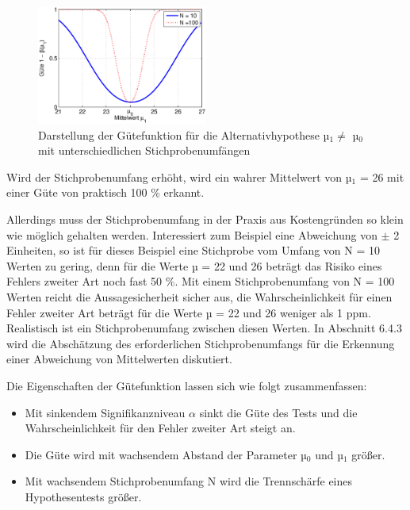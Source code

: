 \noindent 
\begin{figure}[H]
  \centerline{\includegraphics[width=0.5\textwidth]{Kapitel6/Bilder/image12}}
  \caption{Darstellung der G\"{u}tefunktion f\"{u}r die Alternativhypothese µ$_{1} \neq$ µ$_{0}$ mit unterschiedlichen Stichprobenumf\"{a}ngen}
  \label{fig:HypothesentestFehler4}
\end{figure}

\noindent Wird der Stichprobenumfang erh\"{o}ht, wird ein wahrer Mittelwert von µ$_{1}$ = 26 mit einer G\"{u}te von praktisch 100 \% erkannt. \newline

\noindent Allerdings muss der Stichprobenumfang in der Praxis aus Kostengr\"{u}nden so klein wie m\"{o}glich gehalten werden. Interessiert zum Beispiel eine Abweichung von $\pm$ 2 Einheiten, so ist f\"{u}r dieses Beispiel eine Stichprobe vom Umfang von N = 10 Werten zu gering, denn f\"{u}r die Werte µ = 22 und 26 betr\"{a}gt das Risiko eines Fehlers zweiter Art noch fast 50 \%. Mit einem Stichprobenumfang von N = 100 Werten reicht die Aussagesicherheit sicher aus, die Wahrscheinlichkeit f\"{u}r einen Fehler zweiter Art betr\"{a}gt f\"{u}r die Werte µ = 22 und 26 weniger als 1 ppm. Realistisch ist ein Stichprobenumfang zwischen diesen Werten. In Abschnitt 6.4.3 wird die Absch\"{a}tzung des erforderlichen Stichprobenumfangs f\"{u}r die Erkennung einer Abweichung von Mittelwerten diskutiert.\newline

\noindent Die Eigenschaften der G\"{u}tefunktion lassen sich wie folgt zusammenfassen:

\begin{itemize}
    \item Mit sinkendem Signifikanzniveau $\alpha$ sinkt die G\"{u}te des Tests und die Wahrscheinlichkeit f\"{u}r den Fehler zweiter Art steigt an.
    \item  Die G\"{u}te wird mit wachsendem Abstand der Parameter µ$_{0}$ und µ$_{1}$ gr\"{o}{\ss}er.
    \item  Mit wachsendem Stichprobenumfang N wird die Trennsch\"{a}rfe eines Hypothesentests gr\"{o}{\ss}er.
\end{itemize}

